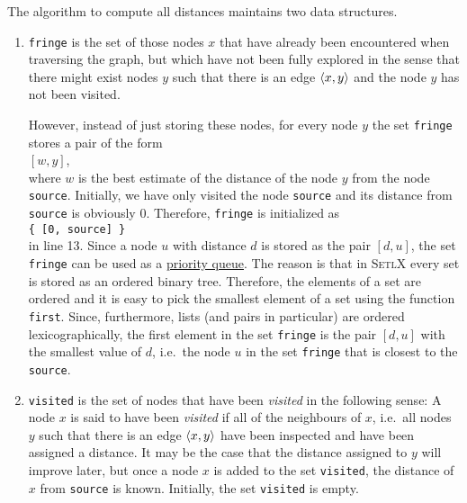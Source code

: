 The algorithm to compute all distances maintains two data structures.
\begin{enumerate}
\item \texttt{fringe} is the set of those nodes $x$ that have already been encountered when traversing
      the graph, but which have not been fully explored in the sense that there might exist nodes $y$ such
      that there is an edge $\pair(x,y)$ and the node $y$ has not been visited.
      
      However, instead of just storing these nodes, for every node $y$ the set \texttt{fringe} stores a pair
      of the form 
      \\[0.2cm]
      \hspace*{1.3cm}
      $[w, y]$,
      \\[0.2cm]
      where $w$ is the best estimate of the distance of the node $y$ from the node \texttt{source}.
      Initially, we have only visited the node \texttt{source} and its distance from \texttt{source}
      is obviously $0$.  Therefore, \texttt{fringe} is initialized as
      \\[0.2cm]
      \hspace*{1.3cm}
      \texttt{\{ [0, source] \}}
      \\[0.2cm]
      in line 13.  Since a node $u$ with distance $d$ is stored as the pair $[d, u]$, the set
      \texttt{fringe} can be used as a \href{https://en.wikipedia.org/wiki/Priority_queue}{priority queue}.  
      The reason is that in \textsc{SetlX} every 
      set is stored as an ordered binary tree.  Therefore, the elements of a set are ordered and it
      is easy to pick the smallest element of a set using the function \texttt{first}.  
      Since, furthermore, lists (and pairs in
      particular) are ordered lexicographically, the first element in the set \texttt{fringe} is 
      the pair $[d, u]$ with the smallest value of $d$, i.e.~the node $u$ in the set \texttt{fringe}
      that is closest to the \texttt{source}.
\item \texttt{visited} is the set of nodes that have been \emph{visited} in the following sense:
      A node $x$ is said to have been \emph{visited} if all of the neighbours of $x$, i.e.~all nodes
      $y$ such that there is an edge $\pair(x,y)$ have been inspected and have been assigned a 
      distance.  It may be the case that the distance assigned to $y$ will improve later,
      but once a node $x$ is added to the set \texttt{visited}, the distance of $x$ from
      \texttt{source} is known.  Initially, the set \texttt{visited} is empty.
\end{enumerate}
